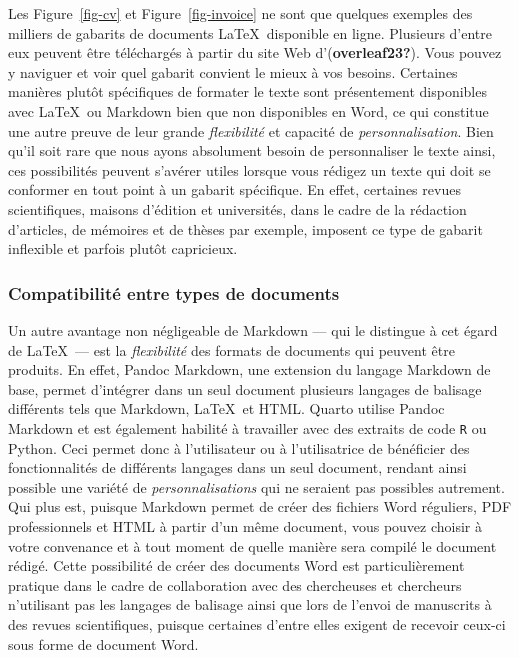 \documentclass[
  letterpaper,
]{scrbook}
\begin{document}
Les Figure~\ref{fig-cv} et Figure~\ref{fig-invoice} ne sont que quelques
exemples des milliers de gabarits de documents \LaTeX~disponible en
ligne. Plusieurs d'entre eux peuvent être téléchargés à partir du site
Web d'(\textbf{overleaf23?}). Vous pouvez y naviguer et voir quel
gabarit convient le mieux à vos besoins. Certaines manières plutôt
spécifiques de formater le texte sont présentement disponibles avec
\LaTeX~ou Markdown bien que non disponibles en Word, ce qui constitue
une autre preuve de leur grande \emph{flexibilité} et capacité de
\emph{personnalisation}. Bien qu'il soit rare que nous ayons absolument
besoin de personnaliser le texte ainsi, ces possibilités peuvent
s'avérer utiles lorsque vous rédigez un texte qui doit se conformer en
tout point à un gabarit spécifique. En effet, certaines revues
scientifiques, maisons d'édition et universités, dans le cadre de la
rédaction d'articles, de mémoires et de thèses par exemple, imposent ce
type de gabarit inflexible et parfois plutôt capricieux.

\hypertarget{compatibilituxe9-entre-types-de-documents}{%
\subsubsection{Compatibilité entre types de
documents}\label{compatibilituxe9-entre-types-de-documents}}

Un autre avantage non négligeable de Markdown --- qui le distingue à cet
égard de \LaTeX~--- est la \emph{flexibilité} des formats de documents
qui peuvent être produits. En effet, Pandoc Markdown, une extension du
langage Markdown de base, permet d'intégrer dans un seul document
plusieurs langages de balisage différents tels que Markdown, \LaTeX~et
HTML. Quarto utilise Pandoc Markdown et est également habilité à
travailler avec des extraits de code \texttt{R} ou Python. Ceci permet
donc à l'utilisateur ou à l'utilisatrice de bénéficier des
fonctionnalités de différents langages dans un seul document, rendant
ainsi possible une variété de \emph{personnalisations} qui ne seraient
pas possibles autrement. Qui plus est, puisque Markdown permet de créer
des fichiers Word réguliers, PDF professionnels et HTML à partir d'un
même document, vous pouvez choisir à votre convenance et à tout moment
de quelle manière sera compilé le document rédigé. Cette possibilité de
créer des documents Word est particulièrement pratique dans le cadre de
collaboration avec des chercheuses et chercheurs n'utilisant pas les
langages de balisage ainsi que lors de l'envoi de manuscrits à des
revues scientifiques, puisque certaines d'entre elles exigent de
recevoir ceux-ci sous forme de document Word.
\end{document}
